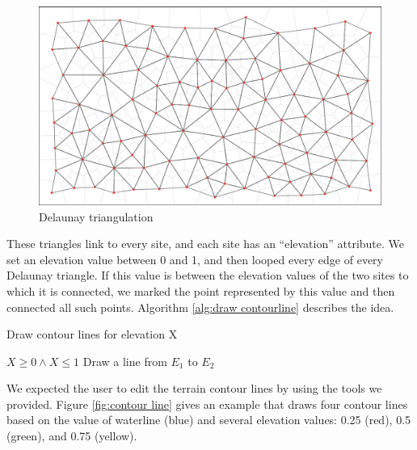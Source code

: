 \begin{figure}[htbp]
  \includegraphics[width=\textwidth]{section04/assets/Map-delaunay-triangulation.png}
  \caption{Delaunay triangulation}
  \label{fig:Delaunay triangulation}
\end{figure}

These triangles link to every site, and each site has an ``elevation'' attribute. We set an elevation value between 0 and 1, and then looped every edge of every Delaunay triangle. If this value is between the elevation values of the two sites to which it is connected, we marked the point represented by this value and then connected all such points. Algorithm \ref{alg:draw contourline} describes the idea.

\begin{algorithm}
\caption{Draw contour lines for elevation X}
\label{alg:draw contourline}
\begin{algorithmic}
\REQUIRE $X \geq 0 \wedge X \leq 1$
\STATE Draw a line from $E_1$ to $E_2$
\ENDIF
\ENDFOR
\ENDFOR
\end{algorithmic}
\end{algorithm}

We expected the user to edit the terrain contour lines by using the tools we provided. Figure \ref{fig:contour line} gives an example that draws four contour lines based on the value of waterline (blue) and several elevation values: 0.25 (red), 0.5 (green), and 0.75 (yellow).

